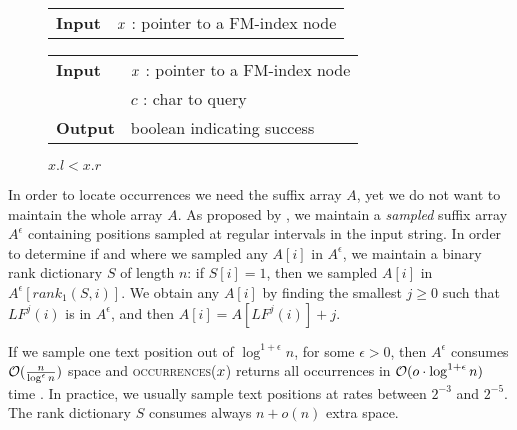 \begin{figure*}
\begin{minipage}[t]{.5\textwidth}
\begin{algorithm}[H]
\label{alg:fm-goroot}
\begin{tabular}{ll}
\textbf{Input}  & $x$ : pointer to a FM-index node\\
\end{tabular}
\begin{algorithmic}[1]
\end{algorithmic}
\end{algorithm}
\end{minipage}
\hfill
\begin{minipage}[t]{.5\textwidth}
\begin{algorithm}[H]
\label{alg:fm-godownc}
\begin{tabular}{ll}
\textbf{Input}  & $x$ : pointer to a FM-index node\\
				& $c$ : char to query\\
\textbf{Output} & boolean indicating success\\
\end{tabular}
\begin{algorithmic}[1]
	\State \Return \False
\EndIf
{}
\State \Return $x.l < x.r$
\end{algorithmic}
\end{algorithm}
\end{minipage}
\end{figure*}

In order to locate occurrences we need the suffix array $A$, yet we do not want to maintain the whole array $A$.
As proposed by \citeauthor{Ferragina2000}, we maintain a \emph{sampled} suffix array $A^{\epsilon}$ containing positions sampled at regular intervals in the input string.
In order to determine if and where we sampled any $A[i]$ in $A^{\epsilon}$, we maintain a binary rank dictionary $S$ of length $n$: if $S[i]=1$, then we sampled $A[i]$ in $A^{\epsilon}[rank_1(S,i)]$.
We obtain any $A[i]$ by finding the smallest $j \geq 0$ such that $LF^j(i)$ is in $A^{\epsilon}$, and then $A[i] = A[LF^j(i)] + j$.

If we sample one text position out of $\log^{1+\epsilon}{n}$, for some $\epsilon > 0$, then $A^{\epsilon}$ consumes $\mathcal{O}(\frac{n}{\log^{\epsilon}{n}})$ space and \textsc{occurrences}($x$) returns all occurrences in $\mathcal{O}(o \cdot \log^{1+\epsilon}{n})$ time \citep{Ferragina2000}.
In practice, we usually sample text positions at rates between $2^{-3}$ and $2^{-5}$.
The rank dictionary $S$ consumes always $n+o(n)$ extra space.

